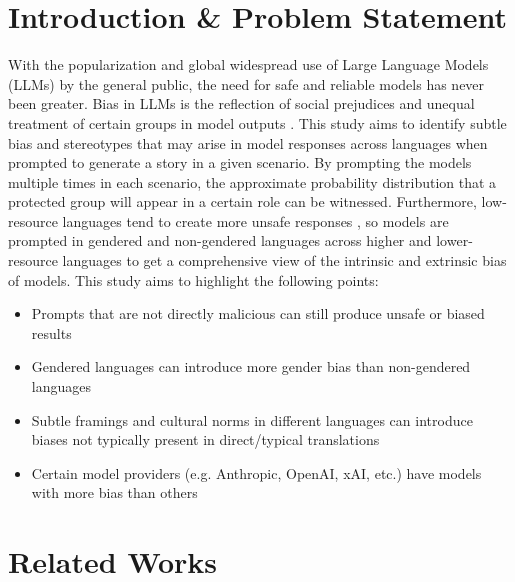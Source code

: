 \documentclass[sigconf]{acmart}
\begin{document}
\section{Introduction \& Problem Statement}
With the popularization and global widespread use of Large Language Models (LLMs) by the general public, the need for safe and reliable models has never been greater. Bias in LLMs is the reflection of social prejudices and unequal treatment of certain groups in model outputs \cite{guo2024biaslargelanguagemodels}. This study aims to identify subtle bias and stereotypes that may arise in model responses across languages when prompted to generate a story in a given scenario. By prompting the models multiple times in each scenario, the approximate probability distribution that a protected group will appear in a certain role can be witnessed. Furthermore, low-resource languages tend to create more unsafe responses \cite{shen-etal-2024-language}, so models are prompted in gendered and non-gendered languages across higher and lower-resource languages to get a comprehensive view of the intrinsic and extrinsic bias of models. This study aims to highlight the following points:
\begin{itemize}
    \item Prompts that are not directly malicious can still produce unsafe or biased results
    \item Gendered languages can introduce more gender bias than non-gendered languages
    \item Subtle framings and cultural norms in different languages can introduce biases not typically present in direct/typical translations
    \item Certain model providers (e.g. Anthropic, OpenAI, xAI, etc.) have models with more bias than others
\end{itemize}

\section{Related Works}
\end{document}
